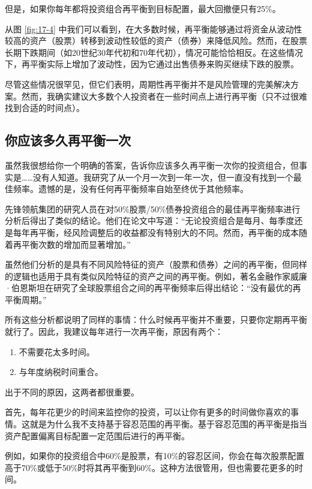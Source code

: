 但是，如果你每年都将投资组合再平衡到目标配置，最大回撤便只有25\%。

从图 \ref{fig:17-4} 中我们可以看到，在大多数时候，再平衡能够通过将资金从波动性较高的资产（股票）转移到波动性较低的资产（债券）来降低风险。然而，在股票长期下跌期间（如20世纪30年代初和70年代初），情况可能恰恰相反。在这些情况下，再平衡实际上增加了波动性，因为它通过出售债券来购买继续下跌的股票。

尽管这些情况很罕见，但它们表明，周期性再平衡并不是风险管理的完美解决方案。然而，我确实建议大多数个人投资者在一些时间点上进行再平衡（只不过很难找到合适的时间点）。

\subsection{你应该多久再平衡一次}
虽然我很想给你一个明确的答案，告诉你应该多久再平衡一次你的投资组合，但事实是……没有人知道。我研究了从一个月一次到一年一次，但一直没有找到一个最佳频率。遗憾的是，没有任何再平衡频率自始至终优于其他频率。

先锋领航集团的研究人员在对50\%股票/50\%债券投资组合的最佳再平衡频率进行分析后得出了类似的结论。他们在论文中写道：“无论投资组合是每月、每季度还是每年再平衡，经风险调整后的收益都没有特别大的不同。然而，再平衡的成本随着再平衡次数的增加而显著增加。”

虽然他们分析的是具有不同风险特征的资产（股票和债券）之间的再平衡，但同样的逻辑也适用于具有类似风险特征的资产之间的再平衡。例如，著名金融作家威廉·伯恩斯坦在研究了全球股票组合之间的再平衡频率后得出结论：“没有最优的再平衡周期。”

所有这些分析都说明了同样的事情：什么时候再平衡并不重要，只要你定期再平衡就行了。因此，我建议每年进行一次再平衡，原因有两个：

\begin{enumerate}
\item 不需要花太多时间。
\item 与年度纳税时间重合。
\end{enumerate}

出于不同的原因，这两者都很重要。

首先，每年花更少的时间来监控你的投资，可以让你有更多的时间做你喜欢的事情。这就是为什么我不支持基于容忍范围的再平衡。基于容忍范围的再平衡是指当资产配置偏离目标配置一定范围后进行的再平衡。

例如，如果你的投资组合中60\%是股票，有10\%的容忍区间，你会在每次股票配置高于70\%或低于50\%时将其再平衡到60\%。这种方法很管用，但也需要花更多的时间。

